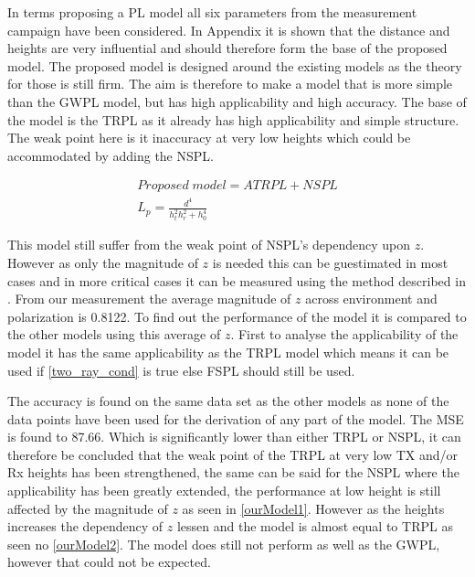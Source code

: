 


In terms proposing a PL model all six parameters from the measurement campaign have been considered. In Appendix it is shown that the distance and heights are very influential and should therefore form the base of the proposed model. %
The proposed model is designed around the existing models as the theory for those is still firm. The aim is therefore to make a model that is more simple than the GWPL model, but has high applicability and high accuracy. The base of the model is the TRPL as it already has high applicability and simple structure. The weak point here is it inaccuracy at very low heights which could be accommodated by adding the NSPL. 

\begin{align}
Proposed\; model = ATRPL + NSPL \\
L_p = \frac{d^4}{h_t^2 h_r^2+h_0^4}
\end{align}

This model still suffer from the weak point of NSPL's dependency upon $z$. However as only the magnitude of $z$ is needed this can be guestimated in most cases and in more critical cases it can be measured using the method described in \cite{Kim}. From our measurement the average magnitude of $z$ across environment and polarization is 0.8122. To find out the performance of the model it is compared to the other models using this average of $z$. First to analyse the applicability of the model it has the same applicability as the TRPL model which means it can be used if \eqref{two_ray_cond} is true else FSPL should still be used. 




The accuracy is found on the same data set as the other models as none of the data points have been used for the derivation of any part of the model. The MSE is found to 87.66. Which is significantly lower than either TRPL or NSPL, it can therefore be concluded that the weak point of the TRPL at very low TX and/or Rx heights has been strengthened, the same can be said for the NSPL where the applicability has been greatly extended, the performance at low height is still affected by the magnitude of $z$ as seen in \autoref{ourModel1}. However as the heights increases the dependency of $z$ lessen and the model is almost equal to TRPL as seen no \autoref{ourModel2}. The model does still not perform as well as the GWPL, however that could not be expected.

